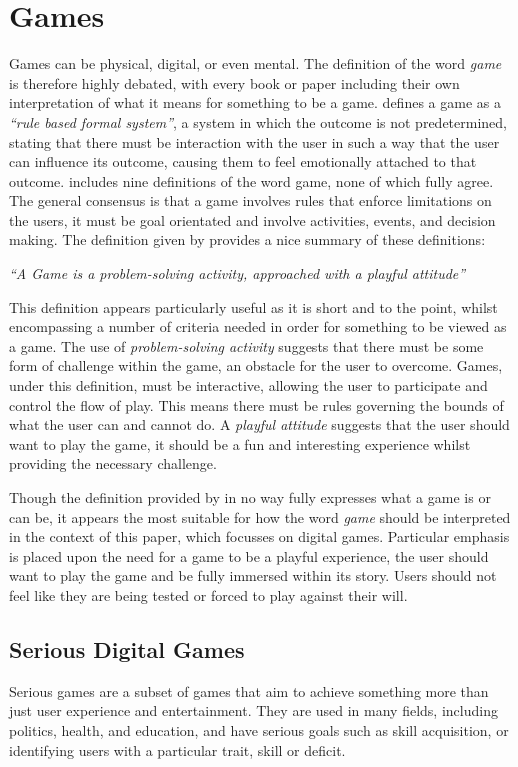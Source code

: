 \documentclass[journal]{IEEEtran}
\newcommand{\inquote}[1]{\textit{``#1''}}
\newcommand{\cquote}[1]{\begin{center}
						\inquote{#1}
					\end{center}	
					}
\begin{document}
\section{Games}
\label{sec:games}
Games can be physical, digital, or even mental. The definition of the word \emph{game} is therefore highly debated, with every book or paper including their own interpretation of what it means for something to be a game. \cite{halfReal} defines a game as a \emph{``rule based formal system''}, a system in which the outcome is not predetermined, stating that there must be interaction with the user in such a way that the user can influence its outcome, causing them to feel emotionally attached to that outcome. \cite{rulesOfPlay} includes nine definitions of the word game, none of which fully agree. The general consensus is that a game involves rules that enforce limitations on the users, it must be goal orientated and involve activities, events, and decision making. The definition given by \cite{artOfGameDesign} provides a nice summary of these definitions: 
\cquote{A Game is a problem-solving activity, approached with a playful
attitude}

This definition appears particularly useful as it is short and to the point, whilst encompassing a number of criteria needed in order for something to be viewed as a game. The use of \textit{problem-solving activity} suggests that there must be some form of challenge within the game, an obstacle for the user to overcome. Games, under this definition, must be interactive, allowing the user to participate and control the flow of play. This means there must be rules governing the bounds of what the user can and cannot do. A \textit{playful attitude} suggests that the user should want to play the game, it should be a fun and interesting experience whilst providing the necessary challenge.

Though the definition provided by \cite{artOfGameDesign} in no way fully expresses what a game is or can be, it appears the most suitable for how the word \emph{game} should be interpreted in the context of this paper, which focusses on digital games. Particular emphasis is placed upon the need for a game to be a playful experience, the user should want to play the game and be fully immersed within its story. Users should not feel like they are being tested or forced to play against their will.

\subsection{Serious Digital Games}
Serious games are a subset of games that aim to achieve something more than just user experience and entertainment\cite{stegeserious}. They are used in many fields, including politics, health, and education, and have serious goals such as skill acquisition, or identifying users with a particular trait, skill or deficit\cite{SeriousOverview}.
 
\end{document}
